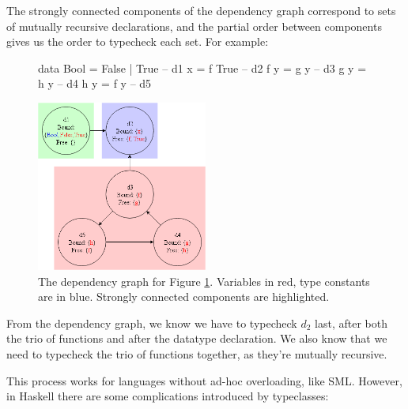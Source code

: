 \documentclass[dissertation.tex]{subfiles}
\begin{document}
{{{            The strongly connected components of the dependency graph correspond to sets of mutually recursive
            declarations, and the partial order between components gives us the order to typecheck each set. For
            example:

            \begin{figure}[H]
                \begin{haskellfigure}
                data Bool = False | True    -- d1
                x = f True                  -- d2
                f y = g y                   -- d3
                g y = h y                   -- d4
                h y = f y                   -- d5
                \end{haskellfigure}
                \caption{}
                \label{code:dependency-graph}
            \end{figure}

            \begin{figure}[H]
                \includegraphics[width=0.5\textwidth]{figures/dependency_graph.png}
                \caption
                {
                    The dependency graph for Figure \ref{code:dependency-graph}. Variables in red, type
                    constants are in blue. Strongly connected components are highlighted.
                }
                \label{fig:dependency-graph}
            \end{figure}

            From the dependency graph, we know we have to typecheck \(d_2\) last, after both the trio of functions and
            after the datatype declaration. We also know that we need to typecheck the trio of functions together, as
            they're mutually recursive.

            This process works for languages without ad-hoc overloading, like SML. However, in Haskell there are some
            complications introduced by typeclasses:

}}}
\end{document}
